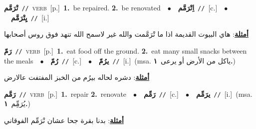 \documentclass[10pt,a4paper,twoside]{article} %
\begin{document}
\begin{multicols}{2}
{\setlength\topsep{0pt}\textbf{\foreignlanguage{arabic}{تْرَمَّم}}\ {\color{gray}\texttt{//}\color{black}}\ \textsc{verb}\ [p.]\ \textbf{1.}~be repaired.  \textbf{2.}~be renovated\ \ $\bullet$\ \ \setlength\topsep{0pt}\textbf{\foreignlanguage{arabic}{اِتْرَمَّم}}\ {\color{gray}\texttt{//}\color{black}}\ [c.]\ \ $\bullet$\ \ \setlength\topsep{0pt}\textbf{\foreignlanguage{arabic}{يِتْرَمَّم}}\ {\color{gray}\texttt{//}\color{black}}\ [i.]\  \begin{flushright}\color{gray}\foreignlanguage{arabic}{\textbf{\underline{\foreignlanguage{arabic}{أمثلة}}}: هاي البيوت القديمة اذا ما تْرَمَّمت والله غير لاسمح الله تنهد فوق روس أصحابها}\end{flushright}\color{black}} \vspace{2mm}

{\setlength\topsep{0pt}\textbf{\foreignlanguage{arabic}{رَمّ}}\ {\color{gray}\texttt{//}\color{black}}\ \textsc{verb}\ [p.]\ \textbf{1.}~eat food off the ground.  \textbf{2.}~eat many small snacks between the meals\ \ $\bullet$\ \ \setlength\topsep{0pt}\textbf{\foreignlanguage{arabic}{رُمّ}}\ {\color{gray}\texttt{//}\color{black}}\ [c.]\ \ $\bullet$\ \ \setlength\topsep{0pt}\textbf{\foreignlanguage{arabic}{يرُمّ}}\ {\color{gray}\texttt{//}\color{black}}\ [i.]\ \color{gray}(msa. \foreignlanguage{arabic}{ياكل من الأرض أو يرعى}~\foreignlanguage{arabic}{\textbf{١.}})\color{black}\  \begin{flushright}\color{gray}\foreignlanguage{arabic}{\textbf{\underline{\foreignlanguage{arabic}{أمثلة}}}: دشره لحاله بيرُم من الخبز المفتفت عالارض}\end{flushright}\color{black}} \vspace{2mm}

{\setlength\topsep{0pt}\textbf{\foreignlanguage{arabic}{رَمَّم}}\ {\color{gray}\texttt{//}\color{black}}\ \textsc{verb}\ [p.]\ \textbf{1.}~repair  \textbf{2.}~renovate\ \ $\bullet$\ \ \setlength\topsep{0pt}\textbf{\foreignlanguage{arabic}{رَمِّم}}\ {\color{gray}\texttt{//}\color{black}}\ [c.]\ \ $\bullet$\ \ \setlength\topsep{0pt}\textbf{\foreignlanguage{arabic}{يرَمِّم}}\ {\color{gray}\texttt{//}\color{black}}\ [i.]\ \color{gray}(msa. \foreignlanguage{arabic}{يُرَمِِّم}~\foreignlanguage{arabic}{\textbf{١.}})\color{black}\  \begin{flushright}\color{gray}\foreignlanguage{arabic}{\textbf{\underline{\foreignlanguage{arabic}{أمثلة}}}: بدنا بقرة جحا عشان نْرَمِّم الفوقاني}\end{flushright}\color{black}} \vspace{2mm}


\end{multicols}
\end{document}
